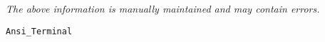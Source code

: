 \label{pkg:ansi\_terminal}

{\tiny \it The above information is manually maintained and may contain errors.}
\begin{verbatim}
Ansi_Terminal
\end{verbatim}
